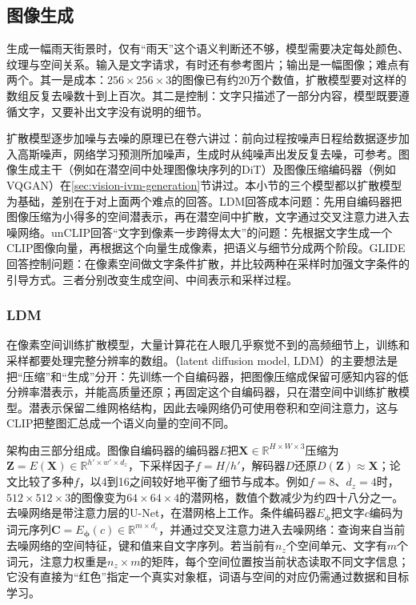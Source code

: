\subsection{图像生成}
\label{sec:vision-models-media-generation}
\label{sec:vision-models-image-generation}

生成一幅雨天街景时，仅有“雨天”这个语义判断还不够，模型需要决定每处颜色、纹理与空间关系。输入是文字请求，有时还有参考图片；输出是一幅图像；难点有两个。其一是成本：$256\times256\times3$的图像已有约20万个数值，扩散模型要对这样的数组反复去噪数十到上百次。其二是控制：文字只描述了一部分内容，模型既要遵循文字，又要补出文字没有说明的细节。

扩散模型逐步加噪与去噪的原理已在卷六讲过：前向过程按噪声日程给数据逐步加入高斯噪声，网络学习预测所加噪声，生成时从纯噪声出发反复去噪，可参考。图像生成主干（例如在潜空间中处理图像块序列的DiT）及图像压缩编码器（例如VQGAN）在\ref{sec:vision-ivm-generation}节讲过。本小节的三个模型都以扩散模型为基础，差别在于对上面两个难点的回答。LDM回答成本问题：先用自编码器把图像压缩为小得多的空间潜表示，再在潜空间中扩散，文字通过交叉注意力进入去噪网络。unCLIP回答“文字到像素一步跨得太大”的问题：先根据文字生成一个CLIP图像向量，再根据这个向量生成像素，把语义与细节分成两个阶段。GLIDE回答控制问题：在像素空间做文字条件扩散，并比较两种在采样时加强文字条件的引导方式。三者分别改变生成空间、中间表示和采样过程。

\subsubsection{LDM}
\label{sec:vision-models-ldm}

在像素空间训练扩散模型，大量计算花在人眼几乎察觉不到的高频细节上，训练和采样都要处理完整分辨率的数组。（latent diffusion model, LDM）的主要想法是把“压缩”和“生成”分开：先训练一个自编码器，把图像压缩成保留可感知内容的低分辨率潜表示，并能高质量还原；再固定这个自编码器，只在潜空间中训练扩散模型。潜表示保留二维网格结构，因此去噪网络仍可使用卷积和空间注意力，这与CLIP把整图汇总成一个语义向量的空间不同。

架构由三部分组成。图像自编码器的编码器$E$把$\bm X\in\mathbb R^{H\times W\times 3}$压缩为$\bm Z=E(\bm X)\in\mathbb R^{h'\times w'\times d_z}$，下采样因子$f=H/h'$，解码器$D$还原$D(\bm Z)\approx\bm X$；论文比较了多种$f$，以4到16之间较好地平衡了细节与成本。例如$f=8$、$d_z=4$时，$512\times512\times3$的图像变为$64\times64\times4$的潜网格，数值个数减少为约四十八分之一。去噪网络是带注意力层的U-Net，在潜网格上工作。条件编码器$E_{\bm\phi}$把文字$c$编码为词元序列$\bm C=E_{\bm\phi}(c)\in\mathbb R^{m\times d_c}$，并通过交叉注意力进入去噪网络：查询来自当前去噪网络的空间特征，键和值来自文字序列。若当前有$n_z$个空间单元、文字有$m$个词元，注意力权重是$n_z\times m$的矩阵，每个空间位置按当前状态读取不同文字信息；它没有直接为“红色”指定一个真实对象框，词语与空间的对应仍需通过数据和目标学习。

